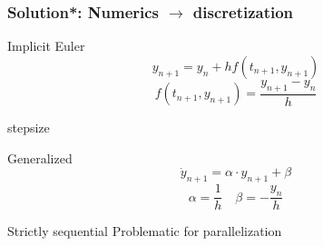 \begin{frame}
\frametitle{Solution*: Numerics \(\rightarrow\) discretization}
\begin{exampleblock}{Implicit Euler}
\begin{equation*}
y_{n+1} = y_n + hf(t_{n+1},y_{n+1})
\end{equation*}
\begin{equation*}
    f(t_{n+1},y_{n+1}) = \frac{y_{n+1} - y_n}{h}
    \end{equation*}
\begin{description}[]
    \item[\(h\)] stepsize
\end{description}
\pause
\begin{block}{Generalized}
    \begin{equation*}
        \dot{y}_{n+1} = \alpha \cdot y_{n+1} + \beta
    \end{equation*}
    \begin{equation*}
        \alpha = \frac{1}{h}\quad\beta = - \frac{y_n}{h}
    \end{equation*}
\end{block}
\end{exampleblock}
\pause
\begin{alertblock}{Strictly sequential}
Problematic for parallelization
\end{alertblock}
\end{frame}

